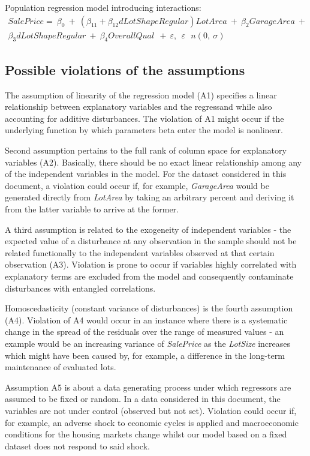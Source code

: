 \documentclass{article}
\begin{document}
Population regression model introducing interactions:
\begin{gather}
SalePrice=\ \beta_0\ +\ (\beta_{11}+\beta_{12}dLotShapeRegular)LotArea\ +\ \beta_2GarageArea\ +\ \\ \beta_3dLotShapeRegular\ +\
\beta_4OverallQual\ \ +\ \varepsilon,\ \ \varepsilon\ ~\ n(0,\ \sigma)
\end{gather}

\subsection{Possible violations of the assumptions}

The assumption of linearity of the regression model (A1) specifies a linear relationship between explanatory variables and the regressand while also accounting for additive disturbances. The violation of A1 might occur if the underlying function by which parameters beta enter the model is nonlinear.

Second assumption pertains to the full rank of column space for explanatory variables (A2). Basically, there should be no exact linear relationship among any of the independent variables in the model. For the dataset considered in this document, a violation could occur if, for example, \emph{GarageArea} would be generated directly from \emph{LotArea} by taking an arbitrary percent and deriving it from the latter variable to arrive at the former. 

A third assumption is related to the exogeneity of independent variables - the expected value of a disturbance at any observation in the sample should not be related functionally to the independent variables observed at that certain observation (A3). Violation is prone to occur if variables highly correlated with explanatory terms are excluded from the model and consequently contaminate disturbances with entangled correlations.

Homoscedasticity (constant variance of disturbances) is the fourth assumption (A4). Violation of A4 would occur in an instance where there is a systematic change in the spread of the residuals over the range of measured values - an example would be an increasing variance of \emph{SalePrice} as the \emph{LotSize} increases which might have been caused by, for example, a difference in the long-term maintenance of evaluated lots.

Assumption A5 is about a data generating process under which regressors are assumed to be fixed or random. In a data considered in this document, the variables are not under control (observed but not set). Violation could occur if, for example, an adverse shock to economic cycles is applied and macroeconomic conditions for the housing markets change whilst our model based on a fixed dataset does not respond to said shock. 
\end{document}
